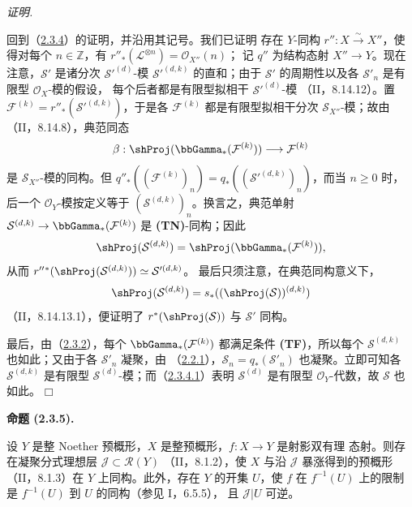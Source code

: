 \documentclass[UTF8,fontset=none,11pt,oneside,openany]{ctexbook}
\providecommand{\square}{\mdlgwhtsquare}
\newenvironment{proposition}[1][]{%
  \par\medskip\noindent\textbf{命题 (#1).}\ %
}{\par}
\newenvironment{proof}{%
  \par\smallskip\noindent\textit{证明.}\ %
}{\hfill$\square$\par}
\newcommand{\oldpage}[2][]{%
  \hypertarget{ega-source-page-#1-#2}{}%
  \marginnote{\scriptsize\textbf{#1}~|~#2}\ignorespaces}
\let\EGAOriginalLabel\label
\renewcommand{\label}[1]{\phantomsection\EGAOriginalLabel{#1}}
\begin{document}
\begin{proof}
回到（\hyperref[III.2.3.4-fr]{2.3.4}）的证明，并沿用其记号。我们已证明
存在 $Y$-同构 $r'':X\xrightarrow{\sim}X''$，使得对每个
$n\in\mathbb Z$，有 $r''_*(\mathcal L^{\otimes n})=\mathcal O_{X''}(n)$；
记 $q''$ 为结构态射 $X''\to Y$。现在注意，$\mathcal S'$ 是诸分次
$\mathcal S'^{(d)}$-模 $\mathcal S'^{(d,k)}$ 的直和；由于 $\mathcal S'$
的周期性以及各 $\mathcal S'_n$ 是有限型 $\mathcal O_X$-模的假设，
每个后者都是有限型拟相干 $\mathcal S'^{(d)}$-模
（II，8.14.12）。置
$\mathcal F^{(k)}=r''_*(\mathcal S'^{(d,k)})$，于是各
$\mathcal F^{(k)}$ 都是有限型拟相干分次 $\mathcal S_{X''}$-模；故由
（II，8.14.8），典范同态
\[
\beta:\shProj(\bbGamma_*(\mathcal F^{(k)}))
\longrightarrow\mathcal F^{(k)}
\]
是 $\mathcal S_{X''}$-模的同构。但
$q''_*((\mathcal F^{(k)})_n)=q_*((\mathcal S'^{(d,k)})_n)$，而当
$n\geq0$ 时，后一个 $\mathcal O_Y$-模按定义等于
$(\mathcal S^{(d,k)})_n$。换言之，典范单射
$\mathcal S^{(d,k)}\to\bbGamma_*(\mathcal F^{(k)})$ 是
\textbf{(TN)}-同构；因此
\[
\shProj(\mathcal S^{(d,k)})
=\shProj(\bbGamma_*(\mathcal F^{(k)})),
\]
从而
$r''{}^*(\shProj(\mathcal S^{(d,k)}))\simeq\mathcal S'^{(d,k)}$。
最后只须注意，在典范同构意义下，
\[
\shProj(\mathcal S^{(d,k)})
=s_*((\shProj(\mathcal S))^{(d,k)})
\]
（II，8.14.13.1），便证明了 $r^*(\shProj(\mathcal S))$ 与
$\mathcal S'$ 同构。

最后，由（\hyperref[III.2.3.2-fr]{2.3.2}），每个
$\bbGamma_*(\mathcal F^{(k)})$ 都满足条件 \textbf{(TF)}，所以每个
$\mathcal S^{(d,k)}$ 也如此；又由于各 $\mathcal S'_n$ 凝聚，由
（\hyperref[III.2.2.1-fr]{2.2.1}），$\mathcal S_n=q_*(\mathcal S'_n)$
也凝聚。立即可知各 $\mathcal S^{(d,k)}$ 是有限型
$\mathcal S^{(d)}$-模；而（\hyperref[III.2.3.4.1-fr]{2.3.4.1}）表明
$\mathcal S^{(d)}$ 是有限型 $\mathcal O_Y$-代数，故 $\mathcal S$
也如此。
\end{proof}

\oldpage[III]{106}
\begin{proposition}[2.3.5]
\label{III.2.3.5-fr}
设 $Y$ 是整 Noether 预概形，$X$ 是整预概形，$f:X\to Y$ 是射影双有理
态射。则存在凝聚分式理想层 $\mathcal J\subset\mathcal R(Y)$
（II，8.1.2），使 $X$ 与沿 $\mathcal J$ 暴涨得到的预概形
（II，8.1.3）在 $Y$ 上同构。此外，存在 $Y$ 的开集 $U$，使 $f$ 在
$f^{-1}(U)$ 上的限制是 $f^{-1}(U)$ 到 $U$ 的同构（参见 I，6.5.5），
且 $\mathcal J|U$ 可逆。
\end{proposition}
\end{document}
